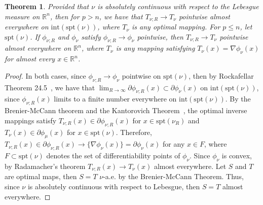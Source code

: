 \documentclass{amsart}
\newtheorem{theorem}{Theorem}
\theoremstyle{lemma}
\theoremstyle{remark}
\begin{document}
\begin{theorem}
Provided that $\nu$ is absolutely continuous with respect to the Lebesgue measure on $\mathbb{R}^n$, then for $p>n$, we have that $T_{\nu;R} \rightarrow T_{\nu}$ pointwise almost everywhere on $\text{int}(\text{spt}(\nu))$, where $T_{\nu}$ is any optimal mapping. For $p \leq n$, let $\text{spt}(\nu)$. If $\phi_{\nu;R}$ and $\phi_{\nu}$ satisfy $\phi_{\nu;R} \rightarrow \phi_{\nu}$ pointwise, then $T_{\nu;R} \rightarrow T_{\nu}$ pointwise almost everywhere on $\mathbb{R}^n$, where $T_{\nu}$ is any mapping satisfying $T_{\nu}(x) = \nabla \phi_{\nu}(x)$ for almost every $x \in \mathbb{R}^n$.
\end{theorem}
\begin{proof}
In both cases, since $\phi_{\nu;R} \rightarrow \phi_{\nu}$ pointwise on $\text{spt}(\nu)$, then by Rockafellar Theorem 24.5~\cite{rockafellar}, we have that $\lim_{R \rightarrow \infty} \partial \phi_{\nu;R}(x) \subset \partial \phi_{\nu}(x)$ on $\text{int}(\text{spt}(\nu))$, since $\phi_{\nu;R}(x)$ limits to a finite number everywhere on $\text{int}(\text{spt}(\nu))$. By the Brenier-McCann theorem and the Kantorovich Theorem~\cite{maggi}, the optimal inverse mappings satisfy $T_{\nu;R}(x) \in \partial \phi_{\nu;R}(x)$ for $x \in \text{spt}(\nu_{R})$ and $T_{\nu}(x) \in \partial \phi_{\mu}(x)$ for $x \in \text{spt}(\nu)$. Therefore, $T_{\nu;R}(x) \in \partial \phi_{\nu;R}(x) \rightarrow \{ \nabla \phi_{\nu}(x) \} = \partial \phi_{\nu}(x)$ for any $x \in F$, where $F \subset \text{spt}(\nu)$ denotes the set of differentiability points of $\phi_{\nu}$. Since $\phi_{\nu}$ is convex, by Radamacher's theorem $T_{\nu;R}(x) \rightarrow T_{\nu}(x)$ almost everywhere. Let $S$ and $T$ are optimal maps, then $S = T$ $\nu$-a.e. by the Brenier-McCann Theorem. Thus, since $\nu$ is absolutely continuous with respect to Lebesgue, then $S = T$ almost everywhere.
\end{proof}
\end{document}
